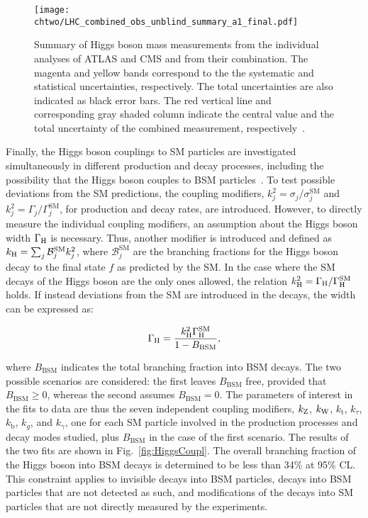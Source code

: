   \begin{figure}[!htb]
  \centering
  \texttt{[image: \\chtwo/LHC\_combined\_obs\_unblind\_summary\_a1\_final.pdf]}
  \caption{Summary of Higgs boson mass measurements from the individual analyses of ATLAS and CMS and from their combination.
  The magenta and yellow bands correspond to the the systematic and statistical uncertainties, respectively. The total uncertainties are also indicated as black error bars.
  The red vertical line and corresponding gray shaded column indicate the central value and the total uncertainty of the combined measurement, respectively~\cite{Aad:2015zhl}.}
  \label{fig:HiggsMass}
\end{figure} 

Finally, the Higgs boson couplings to SM particles are investigated simultaneously in different production and decay processes, including the possibility that the Higgs boson couples to BSM particles~\cite{Khachatryan:2016vau}.
To test possible deviations from the SM predictions, the coupling modifiers, $k^2_j = \sigma_j/\sigma^\mathrm{SM}_j$ and $k^2_j = \Gamma_j/\Gamma^\mathrm{SM}_j$, for production and decay rates, are introduced. 
However, to directly measure the individual coupling modifiers, an assumption about the Higgs boson width $\Gamma_\mathrm{H}$ is necessary. Thus, another modifier is introduced and defined as $k_\mathrm{H} = \sum_j \mathcal{B}^\mathrm{SM}_jk^2_j$, where $\mathcal{B}^\mathrm{SM}_j$ are the branching fractions for the Higgs boson decay to the final state $f$ as predicted by the SM. In the case where the SM decays of the Higgs boson are the only ones allowed,
the relation $k^2_\mathrm{H} = \Gamma_\mathrm{H}/\Gamma^\mathrm{SM}_\mathrm{H}$ holds. If instead deviations from the SM are introduced in the decays, the width can be expressed as:

\begin{equation}\label{eqn:SM_e45}
\Gamma_\mathrm{H} = \frac{k^2_\mathrm{H}\Gamma^\mathrm{SM}_\mathrm{H}}{1 - B_\mathrm{BSM}},
\end{equation}

\noindent where $B_\mathrm{BSM}$ indicates the total branching fraction into BSM decays.
The two possible scenarios are considered: the first leaves $B_\mathrm{BSM}$ free, provided that $B_\mathrm{BSM} \geq 0$, whereas the second assumes $B_\mathrm{BSM} = 0$. 
The parameters of interest in the fits to data are thus the seven independent coupling modifiers, $k_\mathrm{Z}$, $k_\mathrm{W}$, $k_\mathrm{t}$, $k_\tau$, $k_\mathrm{b}$, $k_g$, and $k_\gamma$, 
one for each SM particle involved in the production processes and decay modes studied, plus $B_\mathrm{BSM}$ in the case of the first scenario.
The results of the two fits are shown in Fig.~\ref{fig:HiggsCoupl}.
The overall branching fraction of the Higgs boson into BSM decays is determined to be less than 34\% at 95\% CL.
This constraint applies to invisible decays into BSM particles, decays into BSM particles that are not detected as such, and modifications of the decays into SM particles that are not directly measured by the experiments.

